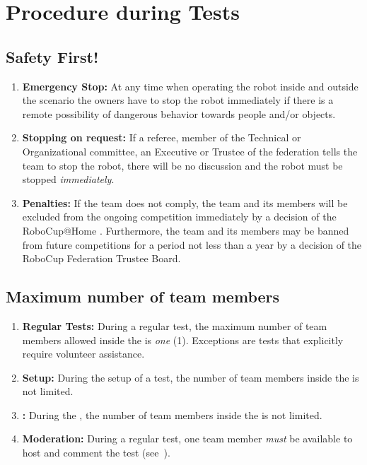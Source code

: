 \section{Procedure during Tests}

\subsection{Safety First!}
\label{rule:safetyfirst}
\begin{enumerate}
	\item \textbf{Emergency Stop:} At any time when operating the robot inside and outside the scenario the owners have to stop the robot immediately if there is a remote possibility of dangerous behavior towards people and/or objects.
	\item \textbf{Stopping on request:} If a referee, member of the Technical or Organizational committee, an Executive or Trustee of the federation tells the team to stop the robot, there will be no discussion and the robot must be stopped \emph{immediately}.
	\item \textbf{Penalties:} If the team does not comply, the team and its members will be excluded from the ongoing competition immediately by a decision of the RoboCup@Home . 	Furthermore, the team and its members may be banned from future competitions for a period not less than a year by a decision of the RoboCup Federation Trustee Board.
\end{enumerate}

\subsection{Maximum number of team members}
\label{rule:number_of_people}
\begin{enumerate}
	\item \textbf{Regular Tests:} During a regular test, the maximum number of team members allowed inside the \Arena{} is \emph{one} (1).
	Exceptions are tests that explicitly require volunteer assistance.
	\item \textbf{Setup:} During the setup of a test, the number of team members inside the \Arena{} is not limited.
	\item \textbf{\FINAL:} During the \FINAL, the number of team members inside the \Arena{} is not limited.
	\item \textbf{Moderation:} During a regular test, one team member \emph{must} be available to host and comment the test (see~).
\end{enumerate}

